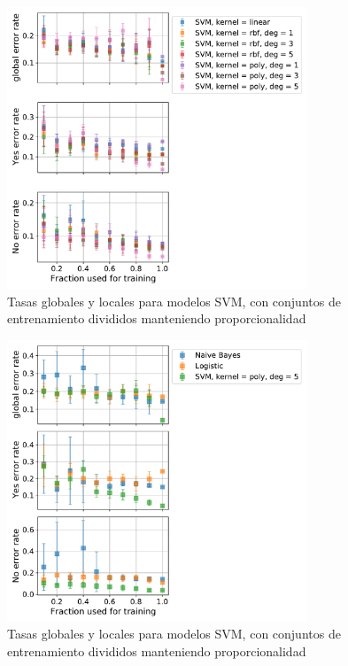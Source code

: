 \documentclass[11pt]{article}
\begin{document}
\begin{figure}[H]
    \centering
    \includegraphics[width = 0.8\textwidth]{2-svm-eq-sizeDependence.pdf}
    \caption{Tasas globales y locales para modelos SVM, con conjuntos de entrenamiento divididos manteniendo proporcionalidad}
    \label{2-svm-eq-sizeDependence}
\end{figure}
\begin{figure}[H]
    \centering
    \includegraphics[width = 0.8\textwidth]{2-final-sizeDependence.pdf}
    \caption{Tasas globales y locales para modelos SVM, con conjuntos de entrenamiento divididos manteniendo proporcionalidad}
    \label{2-final-sizeDependence}
\end{figure}
\end{document}

